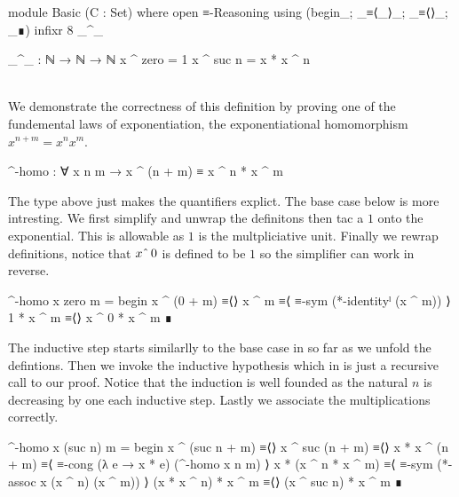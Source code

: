 \documentclass[./Thesis.tex]{subfiles}
\begin{document}
\begin{code}[hide]
  module Basic (C : Set) where
    open ≡-Reasoning using (begin_; _≡⟨_⟩_; _≡⟨⟩_; _∎)
    infixr 8 _^_
\end{code}
\begin{code}
    _^_ : ℕ → ℕ → ℕ
    x ^ zero = 1
    x ^ suc n = x * x ^ n
\end{code} \\

We demonstrate the correctness of this definition by proving one of the
fundemental laws of exponentiation,
the exponentiational homomorphism $x^{n + m} = x^n x^m$.
\begin{code}
    ^-homo : ∀ x n m → x ^ (n + m) ≡ x ^ n * x ^ m
\end{code}
The type above just makes the quantifiers explict. The base case below
is more intresting. We first simplify and unwrap the definitons then
tac a $1$ onto the exponential. This is allowable as $1$ is the
multpliciative unit. Finally we rewrap definitions, notice that
$x \string^{} \, 0$ is defined to be $1$ so the simplifier can work in reverse.
\begin{code}
    ^-homo x zero m = begin
      x ^ (0 + m)   ≡⟨⟩
      x ^ m         ≡⟨ ≡-sym (*-identityˡ (x ^ m)) ⟩
      1 * x ^ m     ≡⟨⟩
      x ^ 0 * x ^ m ∎
\end{code}
The inductive step starts similarlly to the base case in so far as we
unfold the defintions. Then we invoke the inductive hypothesis which in \Agda{}
is just a recursive call to our proof. Notice that the induction is well founded
as the natural $n$ is decreasing by one each inductive step.
Lastly we associate the multiplications correctly.
\begin{code}
    ^-homo x (suc n) m = begin
      x ^ (suc n + m)     ≡⟨⟩
      x ^ suc (n + m)     ≡⟨⟩
      x * x ^ (n + m)     ≡⟨ ≡-cong (λ e → x * e) (^-homo x n m) ⟩
      x * (x ^ n * x ^ m) ≡⟨ ≡-sym (*-assoc x (x ^ n) (x ^ m)) ⟩
      (x * x ^ n) * x ^ m ≡⟨⟩
      (x ^ suc n) * x ^ m ∎
\end{code}
\end{document}
